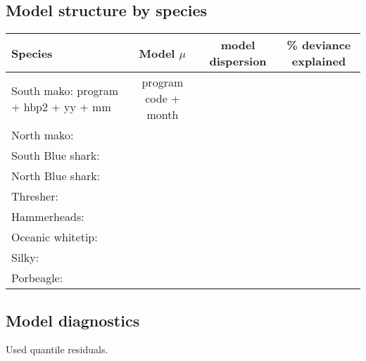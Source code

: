 \documentclass{SCreport}
\begin{document}
\subsection{Model structure by species}
\begin{table}[!h]
\begin{center}
\begin{tabular}{l|ccc}
Species & Model $\mu$& model dispersion &\% deviance explained\\
\hline
\hline
South mako:  program + hbp2 + yy + mm & program code + month \\
North mako: \\
South Blue shark: \\
North Blue shark: \\
Thresher: \\
Hammerheads: \\
Oceanic whitetip: \\
Silky: \\
Porbeagle: \\ 

\end{tabular}
\end{center}
\end{table}
\subsection{Model diagnostics}
Used quantile residuals. 

\BSHnorthaic
\BSHsouthaic
\FALaic
\HHDaic
\MAKnorthaic
\MAKsouthaic
\OCSaic
\PORaic
\THRaic
\end{document}
